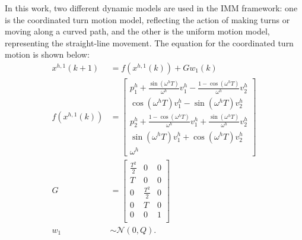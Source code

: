 \documentclass[letterpaper, 10 pt, conference]{ieeeconf}
\begin{document}
	In this work, two different dynamic models are used in the IMM framework: one is the coordinated turn motion model, reflecting the action of making turns or moving along a curved path, and the other is the uniform motion model, representing the straight-line movement. 
	The equation for the coordinated turn motion is shown below:
	\begin{subequations}
		\begin{align*}
		x^{h,1}(k+1)&= f(x^{h,1}(k))+Gw_1(k) \\ 
		f(x^{h,1}(k))&=\left[
		\begin{array}{c}
		p^h_1+\frac{\sin(\omega^h T)}{\omega^h}v^h_1-\frac{1-\cos(\omega^h T)}{\omega^h}v^h_2\\
		\cos(\omega^h T)v^h_1-\sin(\omega^h T)v^h_2\\
		p^h_2+\frac{1-\cos(\omega^h T)}{\omega^h}v^h_1+\frac{\sin(\omega^h T)}{\omega^h}v^h_2\\
		\sin(\omega^h T)v^h_1+\cos(\omega^h T)v^h_2\\
		\omega^h 
		\end{array}\right] \\
		G &= \left[
		\begin{array}{ccc}
		\frac{T^2}{2}& 0& 0\\
		T& 0& 0\\
		0& \frac{T^2}{2}& 0\\
		0& T& 0\\
		0& 0& 1\\
		\end{array}\right] \\
		w_1&\sim\mathcal{N}(0,Q).
		\end{align*}
	\end{subequations}
	
\end{document}
